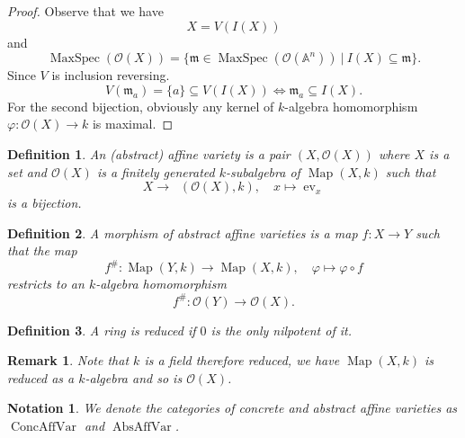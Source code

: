 \documentclass[10pt]{article}
\newtheorem{definition}{Definition}[section]
\newtheorem{notation}{Notation}[section]
\newtheorem{remark}{Remark}[section]
\numberwithin{equation}{theorem}
\DeclareMathOperator{\ev}{ev}
\DeclareMathOperator{\Map}{Map}
\DeclareMathOperator{\Homk}{Hom_{k-alg}}
\DeclareMathOperator{\MaxSpec}{MaxSpec}
\DeclareMathOperator{\ConcAffVar}{ConcAffVar}
\DeclareMathOperator{\AbsAffVar}{AbsAffVar}
\newcommand{\m}[0]{\mathfrak{m}}
\newcommand{\Ouv}[0]{\mathcal{O}}
\newcommand{\A}[0]{\mathbb{A}}
\begin{document}
\begin{proof}
Observe that we have
\begin{equation*}
X = V(I(X))
\end{equation*}
and 
\begin{equation*}
\MaxSpec(\Ouv(X)) = \{\m\in\MaxSpec(\Ouv(\A^n))\:|\: I(X)\subseteq \m\}.
\end{equation*}
Since $V$ is inclusion reversing. 
\begin{equation*}
V(\m_a)=\{a\}\subseteq V(I(X)) \Leftrightarrow \m_a\subseteq I(X).
\end{equation*}
For the second bijection, obviously any kernel of $k$-algebra homomorphism $\varphi:\Ouv(X)\to k$ is maximal. %
\end{proof}

\begin{definition}
An (abstract) affine variety is a pair $(X,\Ouv(X))$ where $X$ is a set and $\Ouv(X)$ is a finitely generated $k$-subalgebra of $\Map(X,k)$ such that 
\begin{equation*}
X\to\Homk(\Ouv(X),k),\quad x\mapsto \ev_x
\end{equation*}
is a bijection.
\end{definition}

\begin{definition}
A morphism of abstract affine varieties is a map $f:X\to Y$ such that the map
\begin{equation*}
f^\#:\Map(Y,k)\to\Map(X,k),\quad \varphi\mapsto \varphi\circ f
\end{equation*}
restricts to an $k$-algebra homomorphism
\begin{equation*}
f^\#:\Ouv(Y)\to\Ouv(X).
\end{equation*}
\end{definition}

\begin{definition}
  A ring is reduced if $0$ is the only nilpotent of it.
\end{definition}

\begin{remark}
Note that $k$ is a field therefore reduced, we have $\Map(X,k)$ is reduced as a $k$-algebra and so is $\mathcal{O}(X)$.
\end{remark}

\begin{notation}
We denote the categories of concrete and abstract affine varieties as $\ConcAffVar$ and $\AbsAffVar$.
\end{notation}
\end{document}
